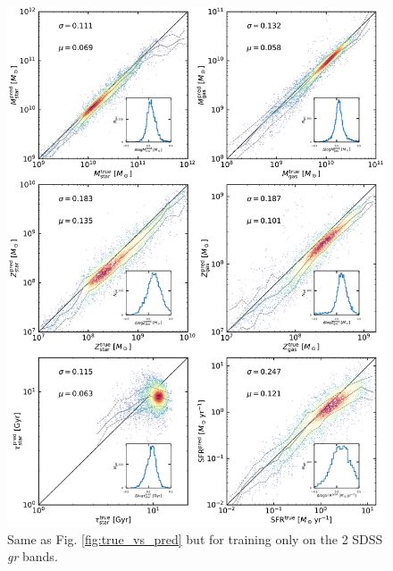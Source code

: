 \documentclass[conference]{IEEEtran}
\begin{document}
\begin{figure}
\vspace{-.4cm}
\begin{center}
\includegraphics[height=.5\textheight]{./plots/predicted_vs_true_all_masked_log_gr.pdf}
\end{center}
\vspace{-.5cm}
\caption{Same as Fig. \ref{fig:true_vs_pred} but for training only on the 2 SDSS \textit{gr} bands.}
\label{fig:true_vs_pred3}
\end{figure}
\end{document}
